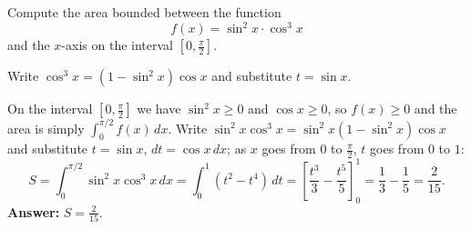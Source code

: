 
\begin{question}
Compute the area bounded between the function
\[ f(x) = \sin^2 x \cdot \cos^3 x \]
and the $x$-axis on the interval $[0, \frac{\pi}{2}]$.
\end{question}

\begin{hint}
Write $\cos^3 x = (1 - \sin^2 x)\cos x$ and substitute $t = \sin x$.
\end{hint}

\begin{solution}
On the interval $[0,\frac\pi2]$ we have $\sin^2 x \ge 0$ and $\cos x\ge 0$, so $f(x) \ge 0$ and the area is simply $\int_0^{\pi/2} f(x)\,dx$.
Write $\sin^2 x\cos^3 x = \sin^2 x(1 - \sin^2 x)\cos x$ and substitute $t = \sin x$, $dt = \cos x\,dx$; as $x$ goes from $0$ to $\frac\pi2$, $t$ goes from $0$ to $1$:
\[ S = \int_0^{\pi/2}\sin^2 x\cos^3 x\,dx = \int_0^1 (t^2 - t^4)\,dt = \left[\frac{t^3}{3} - \frac{t^5}{5}\right]_0^1 = \frac13 - \frac15 = \frac{2}{15}. \]
\textbf{Answer:} $S = \frac{2}{15}$.
\end{solution}
